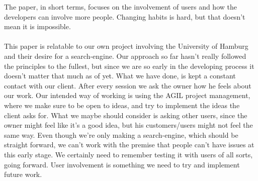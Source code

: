 \documentclass[12pt,a4paper]{article}
\begin{document}
The paper, in short terms, focuses on the involvement of users and how the developers can involve more people. Changing habits is hard, but that doesn't mean it is impossible. 
\\
\\
This paper is relatable to our own project involving the University of Hamburg and their desire for a search-engine. Our approach so far hasn't really followed the principles to the fullest, but since we are so early in the developing process it doesn't matter that much as of yet. What we have done, is kept a constant contact with our client. After every session we ask the owner how he feels about our work. Our intended way of working is using the AGIL project management, where we make sure to be open to ideas, and try to implement the ideas the client asks for. What we maybe should consider is asking other users, since the owner might feel like it's a good idea, but his customers/users might not feel the same way. Even though we're only making a search-engine, which should be straight forward, we can't work with the premise that people can't have issues at this early stage. We certainly need to remember testing it with users of all sorts, going forward. User involvement is something we need to try and implement future work.
\newpage
\end{document}

